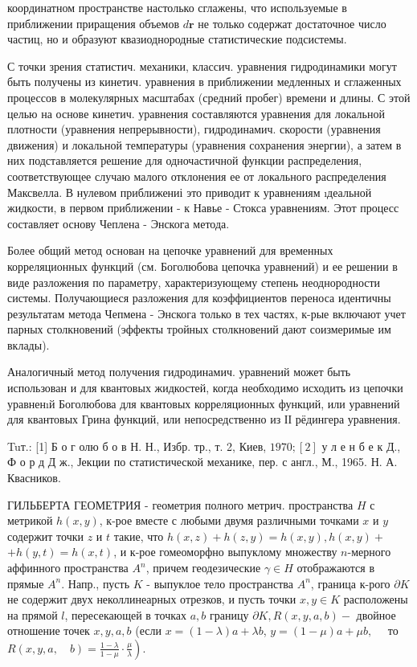 \documentclass[10pt]{article}
\begin{document}
координатном пространстве настолько сглажены, что используемые в приближении приращения объемов $d \boldsymbol{r}$ не только содержат достаточное число частиц, но и образуют квазиоднородные статистические подсистемы.



С точки зрения статистич. механики, классич. уравнения гидродинамики могут быть получены из кинетич. уравнения в приближении медленных и сглаженных процессов в молекулярных масштабах (средний пробег) времени и длины. С этой целью на основе кинетич. уравнения составляются уравнения для локальной плотности (уравнения непрерывности), гидродинамич. скорости (уравнения движения) и локальной температуры (уравнения сохранения энергии), а затем в них подставляется решение для одночастичной функции распределения, соответствующее случаю малого отклонения ее от локального распределения Максвелла. В нулевом приближениі это приводит к уравнениям ıдеальной жидкости, в первом приближении - к Навье - Стокса уравнениям. Этот процесс составляет основу Чеплена - Энскога метода.



Более общий метод основан на цепочке уравнений для временных корреляционных функций (см. Боголюбова цепочка уравнений) и ее решении в виде разложения по параметру, характеризующему степень неоднородности системы. Получающиеся разложения для коэффициентов переноса идентичны результатам метода Чепмена - Энскога только в тех частях, к-рые включают учет парных столкновений (эффекты тройных столкновений дают соизмеримые им вклады).



Аналогичный метод получения гидродинамич. уравнений может быть использован и для квантовых жидкостей, когда необходимо исходить из цепочки уравненıй Боголюбова для квантовых корреляционных функций, или уравнений для квантовых Грина функций, или непосредственно из ІІ рёдингера уравнения.



Tuт.: [1] Б о г олю б о в Н. Н., Избр. тр., т. 2, Киев, $1970 ;[2]$ у л е н б е к Д., Ф о р д Д ж., Јекции по статистической механике, пер. с англ., М., 1965. Н. А. Квасников.



ГИЛЬБЕРТА ГЕОМЕТРИЯ - геометрия полного метрич. пространства $H$ с метрикой $h(x, y)$, к-рое вместе с любыми двумя различными точками $x$ и $y$ содержит точки $z$ и $t$ такие, что $h(x, z)+h(z, y)=h(x, y), h(x, y)+$ $+h(y, t)=h(x, t)$, и к-рое гомеоморфно выпуклому множеству $n$-мерного аффинного пространства $A^{n}$, причем геодезические $\gamma \in H$ отображаются в прямые $A^{n}$. Напр., пусть $K$ - выпуклое тело пространства $A^{n}$, граница к-рого $\partial K$ не содержит двух неколлинеарных отрезков, и пусть точки $x, y \in K$ расположены на прямой $l$, пересекающей в точках $a, b$ границу $\partial K, R(x, y, a, b)-$ двойное отношение точек $x, y, a, b$ (если $x=(1-\lambda) a+\lambda b$, $y=(1-\mu) a+\mu b, \quad$ то $\left.R(x, y, a, \quad b)=\frac{1-\lambda}{1-\mu} \cdot \frac{\mu}{\lambda}\right)$.
\end{document}
